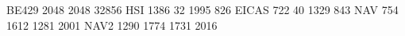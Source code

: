 BE429 2048 2048 32856
HSI      1386   32 1995  826
EICAS     722   40 1329  843
NAV       754 1612 1281 2001
NAV2     1290 1774 1731 2016
